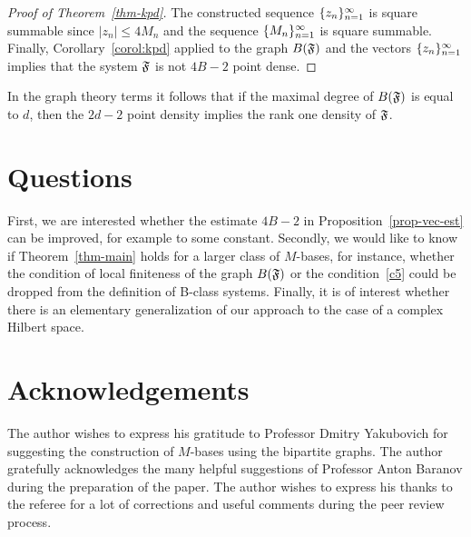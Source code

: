 \documentclass[12pt,oneside,a4paper]{amsart}
\begin{document}
\begin{proof}[Proof of Theorem~\ref{thm-kpd}]
        The constructed sequence $\{{z}_n\}_{n=1}^\infty$ is square summable
          since $\lvert z_n \rvert \leq 4M_n$ and the sequence $\{{M}_n\}_{n=1}^\infty$ is square summable.
        Finally, Corollary~\ref{corol:kpd} applied to the graph $B(\mathfrak{F})$ and the vectors $\{{z}_n\}_{n=1}^\infty$ implies that
          the system $\mathfrak{F}$ is not $4B - 2$ point dense.
      \end{proof}
      \begin{remark*}
        In the graph theory terms it follows that if the maximal degree of $B(\mathfrak{F})$ is equal to $d$,
          then the $2d - 2$ point density implies the rank one density of $\mathfrak{F}$.
      \end{remark*}
  \bigskip
  \section{Questions}
    First, we are interested whether the estimate $4B - 2$ in Proposition~\eqref{prop-vec-est} can be improved, for example to some constant.
    Secondly, we would like to know if Theorem~\ref{thm-main} holds for a larger class of $M$-bases, for instance, whether the condition of
      local finiteness of the graph $B(\mathfrak{F})$ or the condition~\ref{c5} could be dropped from the definition of B-class systems.
    Finally, it is of interest whether there is an elementary generalization of our approach to the case of a complex Hilbert space.

  \section{Acknowledgements}
    The author wishes to express his gratitude to Professor Dmitry Yakubovich for suggesting
      the construction of $M$-bases using the bipartite graphs.
    The author gratefully acknowledges the many helpful suggestions of
      Professor Anton Baranov during the preparation of the paper.
    The author wishes to express his thanks to the referee for a lot of corrections and useful comments during
      the peer review process.
\end{document}
